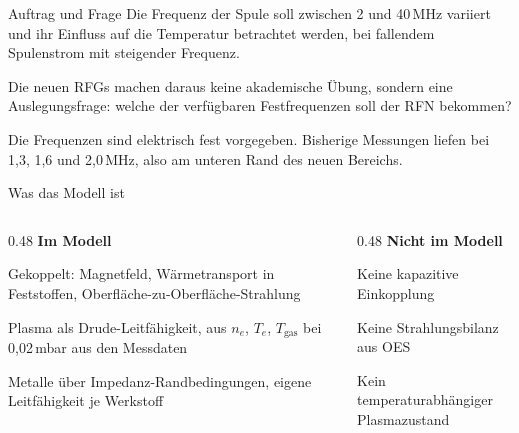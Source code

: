\documentclass[10pt,aspectratio=169]{beamer}
\makeatletter
\let\jlu@olditemize\itemize
\let\jlu@oldenditemize\enditemize
\renewenvironment{itemize}
  {\jlu@olditemize\setlength{\itemsep}{1pt}\setlength{\parsep}{0pt}\setlength{\topsep}{2pt}}
  {\jlu@oldenditemize}
\newcommand{\hinweis}[1]{{\small\color{grauton} #1}}
\makeatother
\begin{document}
\begin{frame}{Auftrag und Frage}
  \vfill
  \large
  Die Frequenz der Spule soll zwischen 2 und 40\,MHz variiert und ihr
  Einfluss auf die Temperatur betrachtet werden, bei fallendem Spulenstrom
  mit steigender Frequenz.

  \vspace{0.8em}
  Die neuen RFGs machen daraus keine akademische Übung, sondern eine
  Auslegungsfrage: welche der verfügbaren Festfrequenzen soll der RFN
  bekommen?

  \vspace{0.8em}
  \small
  \hinweis{Die Frequenzen sind elektrisch fest vorgegeben. Bisherige Messungen liefen bei 1,3, 1,6 und 2,0\,MHz, also am unteren Rand des neuen Bereichs.}
  \vfill
\end{frame}

\begin{frame}{Was das Modell ist}
  \begin{columns}[T]
    \begin{column}{0.48\textwidth}
      \textbf{Im Modell}
      \begin{itemize}
        \item Gekoppelt: Magnetfeld, Wärmetransport in Feststoffen, Oberfläche-zu-Oberfläche-Strahlung
        \item Plasma als Drude-Leitfähigkeit, aus $n_e$, $T_e$, $T_{\text{gas}}$ bei 0,02\,mbar aus den Messdaten
        \item Metalle über Impedanz-Randbedingungen, eigene Leitfähigkeit je Werkstoff
      \end{itemize}
    \end{column}
    \begin{column}{0.48\textwidth}
      \textbf{Nicht im Modell}
      \begin{itemize}
        \item Keine kapazitive Einkopplung
        \item Keine Strahlungsbilanz aus OES
        \item Kein temperaturabhängiger Plasmazustand
      \end{itemize}
    \end{column}
  \end{columns}
\end{frame}
\end{document}
